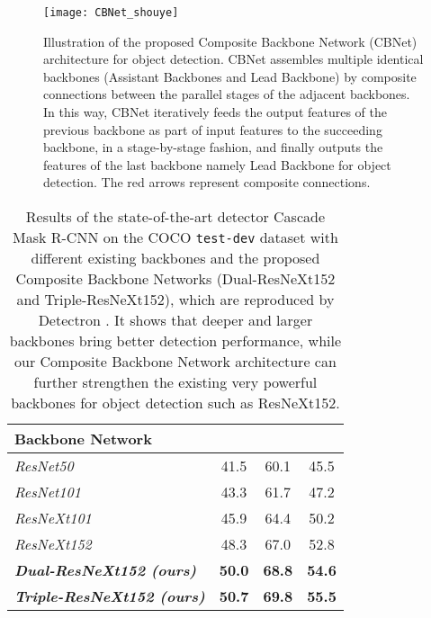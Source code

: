 \documentclass[letterpaper]{article} \usepackage{aaai20}  \usepackage{multirow}
\begin{document}
\begin{figure}[t]
	\centering
	\texttt{[image: CBNet\_shouye]}
	\caption{Illustration of the proposed Composite Backbone Network (CBNet) architecture for object detection. CBNet assembles multiple identical backbones (Assistant Backbones and Lead Backbone) by composite connections between the parallel stages of the adjacent backbones. In this way, CBNet iteratively feeds the output features of the previous backbone as part of input features to the succeeding backbone, in a stage-by-stage fashion, and finally outputs the features of the last backbone namely Lead Backbone for object detection. The red arrows represent composite connections.}
	\label{fig:1}
\end{figure}

\begin{table}[H]
\centering \begin{tabular}{l|ccc} \toprule
		Backbone Network&  &  &  \\ \hline
		\textit{ResNet50}& 41.5 & 60.1 & 45.5\\
		\textit{ResNet101}& 43.3 & 61.7 & 47.2\\
		\textit{ResNeXt101}& 45.9 & 64.4 & 50.2 \\
		\textit{ResNeXt152}& 48.3 & 67.0 & 52.8 \\
		\hline
		\textbf{\textit{Dual-ResNeXt152 (ours)}}& \textbf{50.0} & \textbf{68.8} & \textbf{54.6} \\
		\textbf{\textit{Triple-ResNeXt152 (ours)}}& \textbf{50.7} & \textbf{69.8} & \textbf{55.5}\\
\bottomrule \end{tabular}
	\caption{Results of the state-of-the-art detector Cascade Mask R-CNN on the COCO \texttt{test-dev} dataset \cite{lin2014microsoft} with different existing backbones and the proposed Composite Backbone Networks (Dual-ResNeXt152 and Triple-ResNeXt152), which are reproduced by Detectron \cite{Detectron2018,cai18cascadercnn}. It shows that deeper and larger backbones bring better detection performance, while our Composite Backbone Network architecture can further strengthen the existing very powerful backbones for object detection such as ResNeXt152.} \label{table:backbone with cascade-mask rcnn} \end{table}
\end{document}
